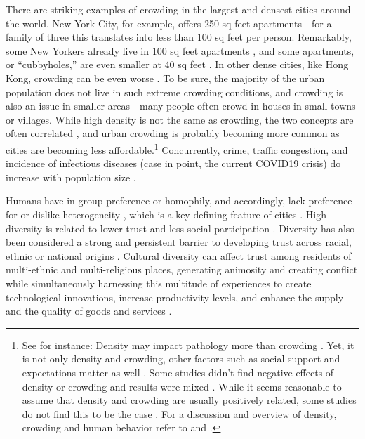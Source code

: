 \documentclass[11pt, letterpaper]{article}
\begin{document}
\begin{spacing}{1.4}
There are striking examples of crowding in the largest and densest cities around the world. New York City, for example, offers 250 sq feet apartments---for a family of three this translates into less than 100 sq feet per person. Remarkably, some New Yorkers already live in 100 sq feet apartments \citep{abc,yoneda,dailynews}, and some apartments, or ``cubbyholes,'' are even smaller at 40 sq feet \citep{newyorktimes}. In other dense cities, like Hong Kong, crowding can be even worse \citep{newyorktimes2}. To
  be sure, the majority of the urban population does not live in such extreme crowding conditions, and crowding is also an issue in smaller areas---many people often crowd in houses in small towns or villages.
  While high density is not the same as crowding, the two concepts are often
  correlated \citep{meyer13}, and urban crowding is probably becoming more
  common  as cities are becoming less affordable.\footnote{See for instance: \citet{misraCL15oct6,floridaCL18apr11,weinbergCL16aug11,solariMISC19apr24,schuetzMISC19may7,kotkin_db_mar20_13}
%    
Density may impact pathology more than crowding \citep{levy1974effects}. Yet, it is not only density and crowding, other  factors such as social support and expectations matter as well \citep{cassel2017health,chan78}. Some
  studies didn't find negative effects of density or crowding and results were  mixed \citep{collette1976urban}. While it seems  reasonable to assume that density and crowding are usually positively related, some studies do not
  find  this to be the case \citep{webb1975meaning,rodgers1982density}.    
%
For a discussion and overview of density, crowding and human behavior refer to \citet{boots1979population,choldin1978urban} and \citet{ramsden09}.} 
% 
Concurrently,  crime, traffic congestion, and incidence of infectious diseases ({case in point, the current COVID19 crisis}) do increase with population size \citep{bettencourt10,bettencourt10b,bettencourt07}.

Humans have in-group preference or homophily, and
accordingly, lack preference for or dislike heterogeneity
\citep{smith14,mcpherson01,bleidorn16,putnam07}, which is a key defining feature
of cities \citep{wirth38,amin06,thrift05}. High diversity is related to lower trust and less social participation \citep{alesina99,alesina00,luttmer01,alesina02,rodriguez2019does}.  
Diversity has also been considered a strong and persistent barrier to developing trust across racial, ethnic or national origins \citep{glaeser00}. Cultural diversity can affect trust among residents of multi-ethnic and multi-religious places, generating animosity and creating conflict while simultaneously harnessing this multitude of experiences to create technological innovations, increase productivity levels, and enhance the supply and the quality of goods and services \citet{rodriguez2019does}. 


\end{spacing}
\end{document}
